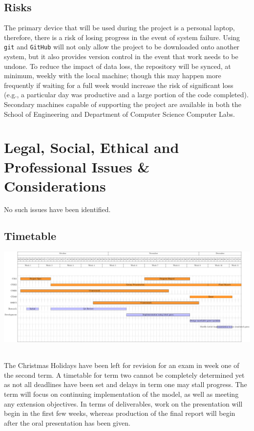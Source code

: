 \documentclass[12pt,a4paper]{article}
\begin{document}
\subsection{Risks}
The primary device that will be used during the project is a personal laptop, therefore, there is a risk of losing 
progress in the event of system failure. Using \texttt{git} and \texttt{GitHub} will not only allow the project to 
be downloaded onto another system, but it also provides version control in the event that work needs to be undone. 
To reduce the impact of data loss, the repository will be synced, at minimum, weekly with the local machine; though 
this may happen more frequently if waiting for a full week would increase the risk of significant loss (e.g., a 
particular day was productive and a large portion of the code completed). Secondary machines capable of supporting 
the project are available in both the School of Engineering and Department of Computer Science Computer Labs.


\section{Legal, Social, Ethical and Professional Issues \& Considerations}
No such issues have been identified.


\begin{landscape}
    \section{Timetable}

    \noindent\centerline{\includegraphics[scale=0.7]{chart.pdf}} \\

    \noindent The Christmas Holidays have been left for revision for an exam in week one of the second term. A 
    timetable for term two cannot be completely determined yet as not all deadlines have been set and delays in term 
    one may stall progress. The term will focus on continuing implementation of the model, as well as meeting any 
    extension objectives. In terms of deliverables, work on the presentation will begin in the first few weeks, 
    whereas production of the final report will begin after the oral presentation has been given.
\end{landscape}




\end{document}
